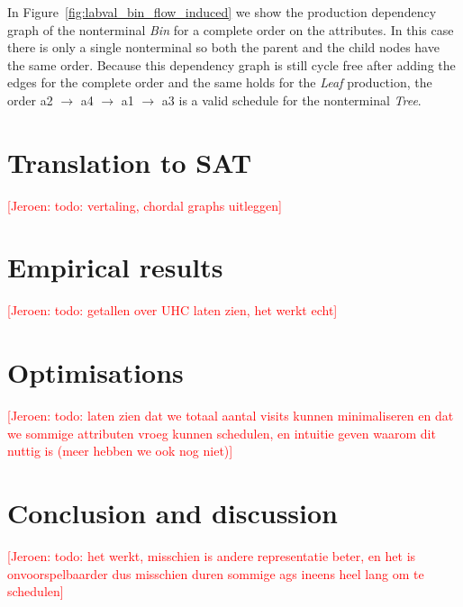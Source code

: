 \documentclass{llncs}
\newif\iffinal\finalfalse
\newcommand{\REM}[3]{\iffinal\else\textcolor{#2}{[#1: #3]}\fi}
\newcommand{\Jeroen}[1]{\REM{Jeroen}{red}{#1}}
\newcommand{\figref}[1]{Figure~\ref{#1}}
\DeclareRobustCommand{\VAN}[3]{#2}
\begin{document}

In \figref{fig:labval_bin_flow_induced} we show the production dependency graph of the nonterminal \emph{Bin} for a complete order on the attributes. In this case there is only a single nonterminal so both the parent and the child nodes have the same order. Because this dependency graph is still cycle free after adding the edges for the complete order and the same holds for the \emph{Leaf} production, the order a2 $\rightarrow$ a4 $\rightarrow$ a1 $\rightarrow$ a3 is a valid schedule for the nonterminal \emph{Tree}.


\section{Translation to SAT} \label{sect:translation}
\Jeroen{todo: vertaling, chordal graphs uitleggen}

\section{Empirical results} \label{sect:results}
\Jeroen{todo: getallen over UHC laten zien, het werkt echt}

\section{Optimisations} \label{sect:optimisations}
\Jeroen{todo: laten zien dat we totaal aantal visits kunnen minimaliseren en dat we sommige attributen vroeg kunnen schedulen, en intuitie geven waarom dit nuttig is (meer hebben we ook nog niet)}

\section{Conclusion and discussion} \label{sect:conclusion}
\Jeroen{todo: het werkt, misschien is andere representatie beter, en het is onvoorspelbaarder dus misschien duren sommige ags ineens heel lang om te schedulen}


\DeclareRobustCommand{\VAN}[3]{#3}


\end{document}
